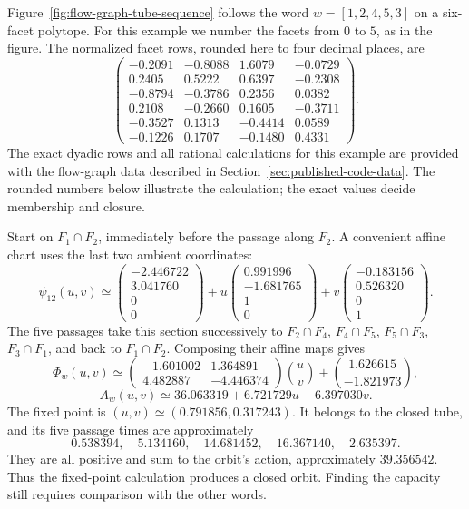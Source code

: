 \begin{example}
\label{ex:flow-graph-return-map}
Figure~\ref{fig:flow-graph-tube-sequence} follows the word
\(w=[1,2,4,5,3]\) on a six-facet polytope.  For this example we number the
facets from \(0\) to \(5\), as in the figure.  The normalized facet rows,
rounded here to four decimal places, are
\[
\begin{pmatrix}
-0.2091&-0.8088& 1.6079&-0.0729\\
 0.2405& 0.5222& 0.6397&-0.2308\\
-0.8794&-0.3786& 0.2356& 0.0382\\
 0.2108&-0.2660& 0.1605&-0.3711\\
-0.3527& 0.1313&-0.4414& 0.0589\\
-0.1226& 0.1707&-0.1480& 0.4331
\end{pmatrix}.
\]
The exact dyadic rows and all rational calculations for this example are
provided with the flow-graph data described in Section~\ref{sec:published-code-data}.
The rounded numbers below illustrate the calculation; the exact values decide
membership and closure.

Start on \(F_1\cap F_2\), immediately before the passage along \(F_2\).
A convenient affine chart uses the last two ambient coordinates:
\[
\psi_{12}(u,v)\simeq
\begin{pmatrix}-2.446722\\3.041760\\0\\0\end{pmatrix}
+u\begin{pmatrix}0.991996\\-1.681765\\1\\0\end{pmatrix}
+v\begin{pmatrix}-0.183156\\0.526320\\0\\1\end{pmatrix}.
\]
The five passages take this section successively to
\(F_2\cap F_4\), \(F_4\cap F_5\), \(F_5\cap F_3\),
\(F_3\cap F_1\), and back to \(F_1\cap F_2\).
Composing their affine maps gives
\[
\Phi_w(u,v)\simeq
\begin{pmatrix}-1.601002&1.364891\\4.482887&-4.446374\end{pmatrix}
\binom uv+
\binom{1.626615}{-1.821973},
\]
\[
A_w(u,v)\simeq36.063319+6.721729u-6.397030v.
\]
The fixed point is \((u,v)\simeq(0.791856,0.317243)\).  It belongs to the
closed tube, and its five passage times are approximately
\[
  0.538394,\quad5.134160,\quad14.681452,\quad16.367140,\quad2.635397.
\]
They are all positive and sum to the orbit's action, approximately
\(39.356542\).  Thus the fixed-point calculation produces a closed orbit.
Finding the capacity still requires comparison with the other words.
\end{example}

